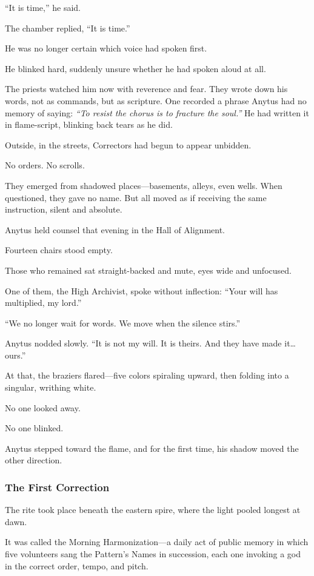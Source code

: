 \documentclass[12pt]{article}
\begin{document}
“It is time,” he said.

The chamber replied, “It is time.”

He was no longer certain which voice had spoken first.

He blinked hard, suddenly unsure whether he had spoken aloud at all.

The priests watched him now with reverence and fear. They wrote down his words, not as commands, but as scripture. One recorded a phrase Anytus had no memory of saying: \textit{“To resist the chorus is to fracture the soul.”} He had written it in flame-script, blinking back tears as he did.

Outside, in the streets, Correctors had begun to appear unbidden.

No orders. 
No scrolls. 

They emerged from shadowed places—basements, alleys, even wells. When questioned, they gave no name. But all moved as if receiving the same instruction, silent and absolute.

Anytus held counsel that evening in the Hall of Alignment. 

Fourteen chairs stood empty. 

Those who remained sat straight-backed and mute, eyes wide and unfocused. 

One of them, the High Archivist, spoke without inflection: “Your will has multiplied, my lord.”

“We no longer wait for words. We move when the silence stirs.”

Anytus nodded slowly. “It is not my will. It is theirs. And they have made it… ours.”

At that, the braziers flared—five colors spiraling upward, then folding into a singular, writhing white.

No one looked away. 

No one blinked.

Anytus stepped toward the flame, and for the first time, his shadow moved the other direction.

\dotfill

\subsubsection{The First Correction}

The rite took place beneath the eastern spire, where the light pooled longest at dawn. 

It was called the Morning Harmonization—a daily act of public memory in which five volunteers sang the Pattern’s Names in succession, each one invoking a god in the correct order, tempo, and pitch.
\end{document}
